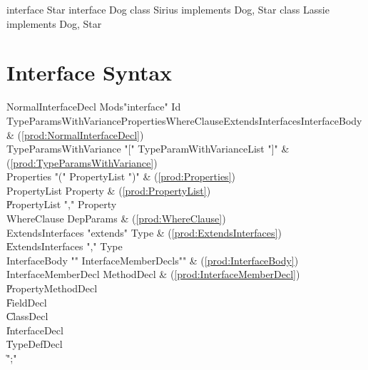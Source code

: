 \begin{ex}
\begin{xten}
interface Star{}
interface Dog{}
class Sirius implements Dog, Star{}
class Lassie implements Dog, Star{}
\end{xten}
%
\end{ex}


\section{Interface Syntax}

\label{DepType:Interface}

\begin{bbgrammar}
 NormalInterfaceDecl \: Mods\opt \xcd"interface" Id TypeParamsWithVariance\opt Properties\opt WhereClause\opt ExtendsInterfaces\opt InterfaceBody & (\ref{prod:NormalInterfaceDecl}) \\
TypeParamsWithVariance \: \xcd"[" TypeParamWithVarianceList \xcd"]" & (\ref{prod:TypeParamsWithVariance}) \\
          Properties \: \xcd"(" PropertyList \xcd")" & (\ref{prod:Properties}) \\
        PropertyList \: Property & (\ref{prod:PropertyList}) \\
                    \| PropertyList \xcd"," Property \\
         WhereClause \: DepParams & (\ref{prod:WhereClause}) \\
   ExtendsInterfaces \: \xcd"extends" Type & (\ref{prod:ExtendsInterfaces}) \\
                    \| ExtendsInterfaces \xcd"," Type \\
       InterfaceBody \: \xcd"{" InterfaceMemberDecls\opt \xcd"}" & (\ref{prod:InterfaceBody}) \\
 InterfaceMemberDecl \: MethodDecl & (\ref{prod:InterfaceMemberDecl}) \\
                    \| PropertyMethodDecl \\
                    \| FieldDecl \\
                    \| ClassDecl \\
                    \| InterfaceDecl \\
                    \| TypeDefDecl \\
                    \| \xcd";" \\
\end{bbgrammar}


